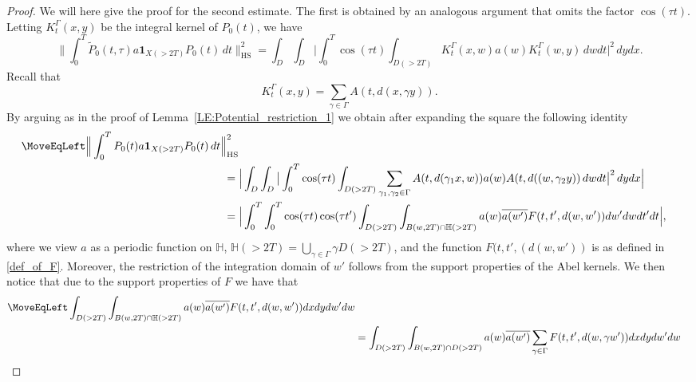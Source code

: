 \documentclass[11pt,twoside,reqno]{amsart}
\newcommand{\bH}{\mathbb{H}}
\newcommand{\1}{\mathrm{\mathbf{1}}}
\newcommand{\bHS}{\mathrm{HS}}
\numberwithin{equation}{section}
\theoremstyle{plain}
\theoremstyle{definition}
\theoremstyle{remark}
\begin{document}
\begin{proof}
We will here give the proof for the second estimate. The first is obtained by an analogous argument that omits the factor $\cos(\tau t)$. Letting $K_{t}^\Gamma(x,y)$ be the integral kernel of $P_0(t)$, we have
\begin{equation*}
   \Big\lVert \int_0^T  \widetilde{P}_0(t,\tau) a \boldsymbol{1}_{X( > 2T)} P_0(t) \,d t  \Big\rVert_{\bHS}^2 = \int_D \int_D \big|\int_0^T \cos(\tau t) \int_{D( > 2T)} K_t^\Gamma(x,w) a(w) K_{t}^\Gamma(w,y) \, d w d t  \big|^2 \, d yd x.
\end{equation*}
Recall that
\begin{equation*}
        K^\Gamma_{t}(x,y)= \sum_{\gamma \in \Gamma} A(t,d(x,\gamma y)).
\end{equation*}
By arguing as in the proof of Lemma~\ref{LE:Potential_restriction_1} we obtain after expanding the square the following identity
\begin{equation*}
    \begin{aligned}
         \MoveEqLeft \Big\lVert \int_0^T  P_0(t) a \boldsymbol{1}_{X( > 2T)} P_0(t) \,d t  \Big\rVert_{\bHS}^2 
         \\
         ={}&  \Big| \int_D \int_D \big| \int_0^T \cos(\tau t) \int_{D( > 2T)} \sum_{\gamma_1,\gamma_2\in\Gamma} A(t,d(\gamma_1 x,w)) a(w) A(t,d((w, \gamma_2 y)) \, d w  d t \big|^2 \, d yd x \Big|
         \\
         ={}&\Big| \int_0^T\int_0^T \cos(\tau t) \cos(\tau t') \int_{D( > 2T)}  \int_{B(w,2T)\cap \bH( > 2T) }  a(w) \overline{a(w')}  F(t,t',d(w,w'))d w' d w      d t'd t\Big|,
    \end{aligned}
\end{equation*}
where we view $a$ as a periodic function on $\bH$,  $ \bH(>2T) = \bigcup_{\gamma \in \Gamma} \gamma D(>2T) $, and the function $F(t,t',(d(w,w'))$ is as defined in \eqref{def_of_F}. Moreover, the restriction of the integration domain of $w'$ follows from the support properties of the Abel kernels. We then notice that due to the support properties of $F$ we have that 
\begin{equation*}
    \begin{aligned}
         \MoveEqLeft  \int_{D( > 2T)}  \int_{B(w,2T)\cap \bH( > 2T) }  a(w) \overline{a(w')}  F(t,t',d(w,w')) dx dyd w' d w  
         \\
         &=  \int_{D( > 2T)}  \int_{B(w,2T)\cap D( > 2T) }  a(w) \overline{a(w')} \sum_{\gamma \in\Gamma}  F(t,t',d(w, \gamma w')) dx dyd w' d w 
         \\

\end{aligned}
\end{equation*}
\end{proof}
\end{document}
